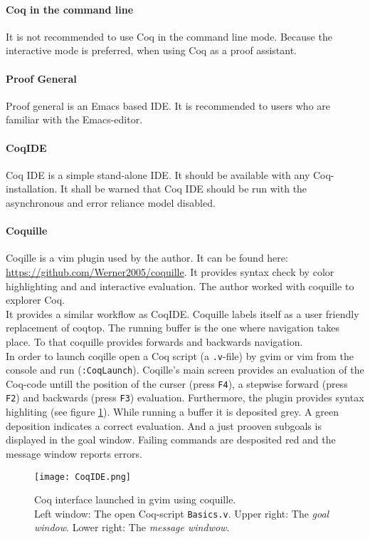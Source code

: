 \paragraph{Coq in the command line}
It is not recommended to use Coq in the command line mode. 
Because the interactive mode is preferred, when using Coq as a proof assistant. 


\paragraph{Proof General}
Proof general is an Emacs based IDE. 
It is recommended to users who are familiar with the Emacs-editor.

\paragraph{CoqIDE}
Coq IDE is a simple stand-alone IDE. 
It should be available with any Coq-installation. 
It shall be warned that Coq IDE should be run with the asynchronous and error reliance model disabled. 

\paragraph{Coquille}
Coqille is a vim plugin used by the author.
It can be found here: \url{https://github.com/Werner2005/coquille}.
It provides syntax check by color highlighting and and interactive evaluation.  
The author worked with coquille to explorer Coq.\\
It provides a similar workflow as CoqIDE. 
Coquille labels itself as a user friendly  replacement of \gls{coqtop}. 
The running buffer is the one where navigation takes place. 
To that coquille provides forwards and backwards navigation.\\


In order to launch coqille open a Coq script (a \texttt{.v}-file) by gvim or vim from the console and run (\texttt{:CoqLaunch}). 
Coqille's main screen provides an evaluation of the Coq-code untill the position of the curser (press \texttt{F4}), a stepwise forward (press \texttt{F2}) and backwards (press \texttt{F3}) evaluation.                 
Furthermore, the plugin provides syntax highliting (see figure \ref{fig:Coquille}).
While running a buffer it is deposited grey.  
A green deposition indicates a correct evaluation. 
And a just prooven subgoals is displayed in the goal window. 
Failing commands are desposited red and the message window reports errors.





\begin{figure}[h]
\texttt{[image: CoqIDE.png]}
\caption{Coq interface launched in gvim using coquille.\\ 
Left window: The open Coq-script \texttt{Basics.v}.
Upper right: The {\itshape goal window}. 
Lower right: The {\itshape message windwow}.}
\label{fig:Coquille}
\end{figure}


